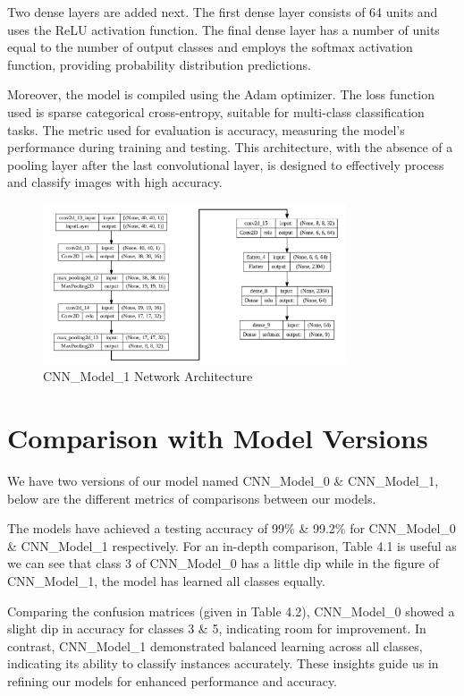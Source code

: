 \noindent Two dense layers are added next. The first dense layer consists of 64 units and uses the ReLU activation function. The final dense layer has a number of units equal to the number of output classes and employs the softmax activation function, providing probability distribution predictions.

\noindent Moreover, the model is compiled using the Adam optimizer. The loss function used is sparse categorical cross-entropy, suitable for multi-class classification tasks. The metric used for evaluation is accuracy, measuring the model's performance during training and testing. This architecture, with the absence of a pooling layer after the last convolutional layer, is designed to effectively process and classify images with high accuracy.

\begin{figure}[h!]
    \centering
    \includegraphics[width=0.8\textwidth]{Images/Perf_Eval/NN_Architecture.png}
    \caption{CNN\_Model\_1 Network Architecture}
\end{figure}

\clearpage

\section{Comparison with Model Versions}

We have two versions of our model named CNN\_Model\_0 \& CNN\_Model\_1, below are the different metrics of comparisons between our models.

\noindent The models have achieved a testing accuracy of 99\% \& 99.2\% for CNN\_Model\_0 \& CNN\_Model\_1 respectively. For an in-depth comparison, Table 4.1 is useful as we can see that class 3 of CNN\_Model\_0 has a little dip while in the figure of CNN\_Model\_1, the model has learned all classes equally.

\noindent Comparing the confusion matrices (given in Table 4.2), CNN\_Model\_0 showed a slight dip in accuracy for classes 3 \& 5, indicating room for improvement. In contrast, CNN\_Model\_1 demonstrated balanced learning across all classes, indicating its ability to classify instances accurately. These insights guide us in refining our models for enhanced performance and accuracy.

